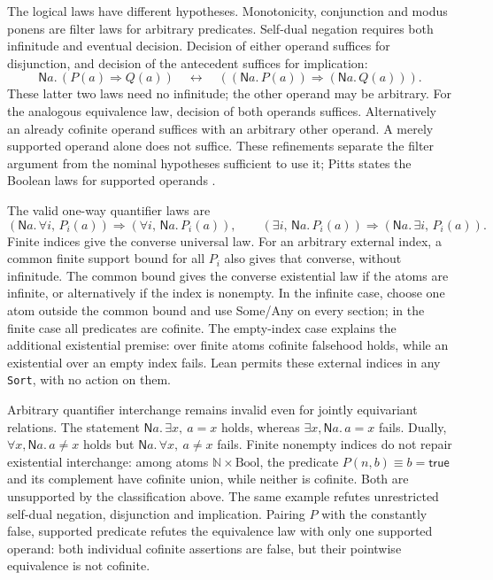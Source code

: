 The logical laws have different hypotheses. Monotonicity, conjunction and
modus ponens are filter laws for arbitrary predicates. Self-dual negation
requires both infinitude and eventual decision. Decision of either operand
suffices for disjunction, and decision of the antecedent suffices for implication:
\[
 \mathsf N a.\,(P(a)\Rightarrow Q(a))
 \quad\longleftrightarrow\quad
 ((\mathsf N a.\,P(a))\Rightarrow(\mathsf N a.\,Q(a))).
\]
These latter two laws need no infinitude; the other operand may be arbitrary.
For the analogous equivalence law, decision of both operands suffices.
Alternatively an already cofinite operand suffices with an arbitrary other
operand. A merely supported operand alone does not suffice. These refinements separate the filter
argument from the nominal hypotheses sufficient to use it; Pitts states
the Boolean laws for supported operands \cite[Proposition~3.10]{pitts2013}.

The valid one-way quantifier laws are
\[
 (\mathsf N a.\,\forall i,\,P_i(a))\Rightarrow
       (\forall i,\,\mathsf N a.\,P_i(a)),\qquad
 (\exists i,\,\mathsf N a.\,P_i(a))\Rightarrow
       (\mathsf N a.\,\exists i,\,P_i(a)).
\]
Finite indices give the converse universal law. For an arbitrary external
index, a common finite support bound for all $P_i$ also gives that converse,
without infinitude. The common bound gives the converse existential law if
the atoms are infinite, or alternatively if the index is nonempty. In the
infinite case, choose one atom outside the common bound and use Some/Any on
every section; in the finite case all predicates are cofinite. The empty-index
case explains the additional existential premise: over finite atoms cofinite
falsehood holds, while an existential over an empty index fails. Lean permits
these external indices in any \texttt{Sort}, with no action on them.

Arbitrary quantifier interchange remains invalid even for jointly equivariant
relations. The statement $\mathsf N a.\,\exists x,\ a=x$ holds, whereas
$\exists x,\mathsf N a.\,a=x$ fails. Dually,
$\forall x,\mathsf N a.\,a\ne x$ holds but
$\mathsf N a.\,\forall x,\ a\ne x$ fails.
Finite nonempty indices do not repair existential interchange: among atoms
$\mathbb N\times\mathrm{Bool}$, the predicate $P(n,b)\equiv b=\mathsf{true}$
and its complement have cofinite union, while neither is cofinite. Both are
unsupported by the classification above. The same example refutes unrestricted
self-dual negation, disjunction and implication. Pairing $P$ with the constantly
false, supported predicate refutes the equivalence law with only one supported
operand: both individual cofinite assertions are false, but their pointwise
equivalence is not cofinite.

